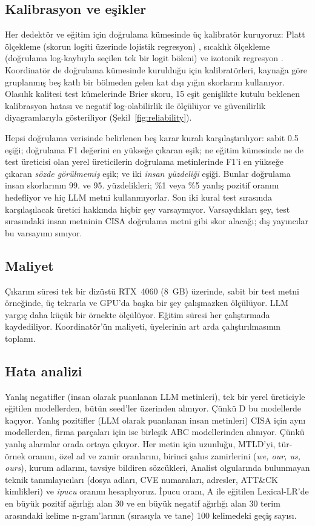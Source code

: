 \documentclass[journal]{IEEEtran}
\begin{document}
\subsection{Kalibrasyon ve eşikler}
Her dedektör ve eğitim için doğrulama kümesinde üç kalibratör kuruyoruz: Platt ölçekleme (skorun logiti üzerinde
lojistik regresyon) \cite{Platt_1999}, sıcaklık ölçekleme (doğrulama log-kaybıyla seçilen tek bir logit böleni)
\cite{Guo_2017} ve izotonik regresyon \cite{Zadrozny_2002}. Koordinatör de doğrulama kümesinde kurulduğu için
kalibratörleri, kaynağa göre gruplanmış beş katlı bir bölmeden gelen kat dışı yığın skorlarını kullanıyor. Olasılık
kalitesi test kümelerinde Brier skoru, 15 eşit genişlikte kutulu beklenen kalibrasyon hatası \cite{Naeini_2015} ve
negatif log-olabilirlik ile ölçülüyor ve güvenilirlik diyagramlarıyla gösteriliyor (Şekil~\ref{fig:reliability}).

Hepsi doğrulama verisinde belirlenen beş karar kuralı karşılaştırılıyor: sabit 0.5 eşiği; doğrulama F1 değerini en
yükseğe çıkaran eşik; ne eğitim kümesinde ne de test üreticisi olan yerel üreticilerin doğrulama metinlerinde F1'i
en yükseğe çıkaran \emph{sözde görülmemiş} eşik; ve iki \emph{insan yüzdeliği} eşiği. Bunlar doğrulama insan
skorlarının 99. ve 95. yüzdelikleri; \%1 veya \%5 yanlış pozitif oranını hedefliyor ve hiç LLM metni kullanmıyorlar.
Son iki kural test sırasında karşılaşılacak üretici hakkında hiçbir şey varsaymıyor. Varsaydıkları şey, test
sırasındaki insan metninin CISA doğrulama metni gibi skor alacağı; dış yayıncılar bu varsayımı sınıyor.

\subsection{Maliyet}
Çıkarım süresi tek bir dizüstü RTX~4060 (8~GB) üzerinde, sabit bir test metni örneğinde, üç tekrarla ve GPU'da
başka bir şey çalışmazken ölçülüyor. LLM yargıç daha küçük bir örnekte ölçülüyor. Eğitim süresi her çalıştırmada
kaydediliyor. Koordinatör'ün maliyeti, üyelerinin art arda çalıştırılmasının toplamı.

\subsection{Hata analizi}\label{sec:errors}
Yanlış negatifler (insan olarak puanlanan LLM metinleri), tek bir yerel üreticiyle eğitilen modellerden, bütün
seed'ler üzerinden alınıyor. Çünkü D bu modellerde kaçıyor. Yanlış pozitifler (LLM olarak puanlanan insan metinleri)
CISA için aynı modellerden, firma parçaları için ise birleşik ABC modellerinden alınıyor. Çünkü yanlış alarmlar
orada ortaya çıkıyor. Her metin için uzunluğu, MTLD'yi, tür-örnek oranını, özel ad ve zamir oranlarını, birinci
şahıs zamirlerini (\emph{we, our, us, ours}), kurum adlarını, tavsiye bildiren sözcükleri, Analist olgularında
bulunmayan teknik tanımlayıcıları (dosya adları, CVE numaraları, adresler, ATT\&CK kimlikleri) ve \emph{ipucu}
oranını hesaplıyoruz. İpucu oranı, A ile eğitilen Lexical-LR'de en büyük pozitif ağırlığı alan 30 ve en büyük
negatif ağırlığı alan 30 terim arasındaki kelime n-gram'larının (sırasıyla \NCueLlm{} ve \NCueHuman{} tane) 100
kelimedeki geçiş sayısı.
\end{document}
